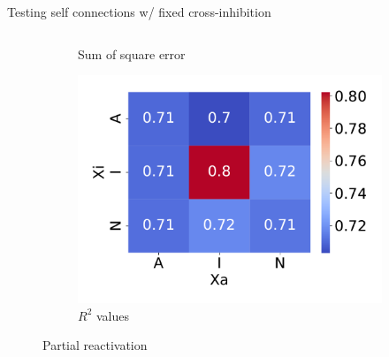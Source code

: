 \documentclass[aspectratio=169,9pt]{beamer}
\begin{document}
\begin{frame}{Testing self connections w/ fixed cross-inhibition}
\begin{columns}
\begin{column}{0.3\textwidth}
\begin{figure}[h]
\begin{subfigure}[b]{\textwidth}
                            \caption{Sum of square error}
                        \end{subfigure}
                        \begin{subfigure}[b]{\textwidth}
                            \centering
                            \includegraphics[width=\textwidth]{vary_self-Partial_timeshifted-rsq-hmap}
                            \caption{$R^2$ values}
                        \end{subfigure}
                    \caption{Partial reactivation}
                \end{figure}
            \end{column}
        \end{columns}
    \end{frame}
\end{document}
